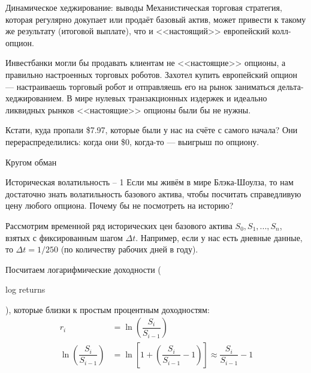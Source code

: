 \documentclass{beamer}
\newcommand{\en}[1]{\begin{otherlanguage}{english}#1\end{otherlanguage}}
\begin{document}
\begin{frame}{Динамическое хеджирование: выводы}
\justify
Механистическая торговая стратегия, которая регулярно докупает или продаёт базовый актив, может привести к такому же
результату (итоговой выплате), что и <<настоящий>> европейский колл-опцион.

\justify
Инвестбанки могли бы продавать клиентам не <<настоящие>> опционы, а правильно настроенных торговых роботов. Захотел
купить европейский опцион --- настраиваешь торговый робот и отправляешь его на рынок заниматься дельта-хеджированием.
В мире нулевых транзакционных издержек и идеально ликвидных рынков <<настоящие>> опционы были бы не нужны.

\justify
Кстати, куда пропали \$7.97, которые были у нас на счёте с самого начала? Они перераспределились: когда они \$0,
когда-то --- выигрыш по опциону.
\end{frame}



\begin{frame}{Кругом обман}
\centering
{}
\end{frame}



\begin{frame}{Историческая волатильность -- 1}
\justify
Если мы живём в мире Блэка-Шоулза, то нам достаточно знать волатильность базового актива, чтобы посчитать справедливую цену любого опциона. Почему бы не посмотреть на историю?

\justify
Рассмотрим временной ряд исторических цен базового актива $S_0,S_1,...,S_n$, взятых с фиксированным шагом $\Delta t$. Например, если у нас есть дневные данные, то $\Delta t = 1/250$ (по количеству рабочих дней в году). 

\justify
Посчитаем логарифмические доходности (\en{log returns}), которые близки к простым процентным доходностям:
\begin{align*}
r_i &= \ln \left( \dfrac{S_{i}}{S_{i-1}} \right) \\
\ln \left(\dfrac{S_{i}}{S_{i-1}} \right) &= \ln \left[1 + \left(\dfrac{S_{i}}{S_{i-1}} - 1 \right) \right] \approx \dfrac{S_{i}}{S_{i-1}} - 1
\end{align*}
\end{frame}
\end{document}
